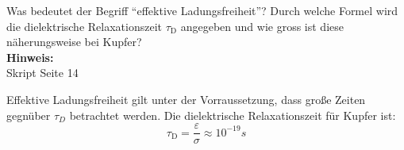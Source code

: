 \begin{question}[section=2,name={Ladungsfreiheit und Relaxationszeit},difficulty=,quantity=5,type=thr,tags={20131210}]
	Was bedeutet der Begriff "`effektive Ladungsfreiheit"'? Durch welche Formel wird die dielektrische Relaxationszeit $\tau_\mathrm{D}$ angegeben und wie gross ist diese näherungsweise bei Kupfer?
	\\ \textbf{Hinweis:}\\
	Skript Seite 14
\end{question}
\begin{solution}
	Effektive Ladungsfreiheit gilt unter der Vorraussetzung, dass große Zeiten gegnüber $\tau_D$ betrachtet werden. Die dielektrische Relaxationszeit für Kupfer ist:
	\begin{equation}
		\tau_\mathrm{D} = \frac{\varepsilon}{\sigma} \approx  10^{-19}s
	\end{equation}
\end{solution}